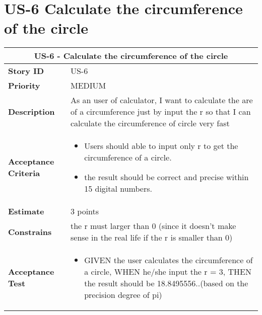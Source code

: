 \documentclass[12pt]{report}
\begin{document}
{\section{US-6 Calculate the circumference of the circle}
\begin{tabular}{ |p{4cm}|p{11cm}|  }
 \hline
 \multicolumn{2}{|c|}{US-6 - Calculate the circumference of the circle } \\
 \hline
 \textbf {Story ID}& US-6 \\
 \hline
 \textbf{Priority} & MEDIUM \\
 \hline
  \textbf{Description}   & As an user of calculator, I want to calculate the are of a circumference just by input the r so that I can calculate the circumference of circle very fast  \\
  \hline
  \textbf{Acceptance Criteria}&
     \begin{itemize}
     \item  Users should able to input only r to get the circumference of a circle. 
     \item  the result should be correct and precise within 15 digital numbers.
\end{itemize}
  \\
 \hline
 \textbf{Estimate} & 3 points\\
 \hline
 \textbf{Constrains}& the r must larger than 0 (since it doesn't make sense in the real life if the r is smaller than 0)   \\
 \hline
  \textbf{Acceptance Test}& 
   \begin{itemize}
     \item  GIVEN the user calculates the circumference of a circle, WHEN he/she input the r = 3, THEN the result should be 18.8495556..(based on the precision degree of pi)
\end{itemize}
  \\
 \hline
\end{tabular}

}
\end{document}
